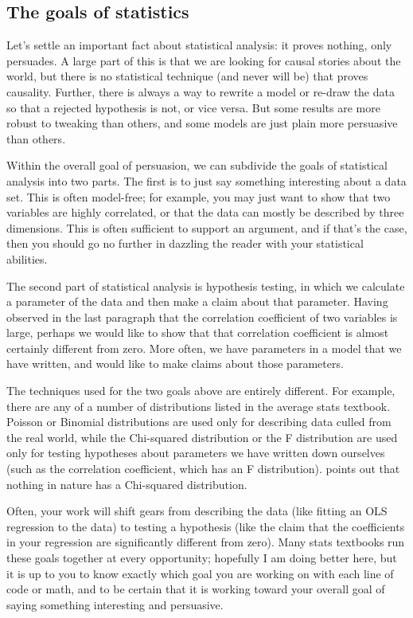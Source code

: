 \documentclass[12pt,notitlepage, openany]{book}
\def\ind#1{\index{#1}#1}
\begin{document}
\subsection{The goals of statistics} Let's settle an
important fact about statistical analysis: it proves nothing, only
persuades. A large part of this is that we are looking for causal stories
about the world, but there is no statistical technique (and never will be)
that proves \ind{causality}. Further, there is always a way to rewrite a model
or re-draw the data so that a rejected hypothesis is not, or vice versa.
But some results are more robust to tweaking 
than others, and some models are just plain more persuasive than others.

Within the overall goal of persuasion, we can subdivide the goals of
statistical analysis into two parts. The first is to just say something
interesting about a data set. This is often model-free; for example,
you may just want to show that two variables are highly correlated, or
that the data can mostly be described by three dimensions. This is often
sufficient to support an argument, and if that's the case, then you should
go no further in dazzling the reader with your statistical abilities.

The second part of statistical analysis is hypothesis testing, in which
we calculate a parameter of the data and then make a claim about that
parameter.  Having observed in the last paragraph that the correlation
coefficient of two variables is large, perhaps we would like to show
that that correlation coefficient is almost certainly different from
zero. More often, we have parameters in a model that we have written,
and would like to make claims about those parameters.

The techniques used for the two goals above are entirely different. For
example, there are any of a number of distributions listed in the
average stats textbook.  Poisson or Binomial distributions are used
only for describing data culled from the real world, while the Chi-squared
distribution or the F distribution are used only for testing hypotheses
about parameters we have written down ourselves (such as the correlation
coefficient, which has an F distribution). \cite{kmenta} points out that nothing
in nature has a Chi-squared distribution. 

Often, your work will shift
gears from describing the data (like fitting an OLS regression to the
data) to testing a hypothesis (like the claim that the coefficients
in your regression are significantly different from zero). Many stats
textbooks run these goals together at every opportunity;
hopefully I am doing better here, but it is up to you to know exactly
which goal you are working on with each line of code or math, and to be
certain that it is working toward your overall goal of saying something
interesting and persuasive.
\end{document}
